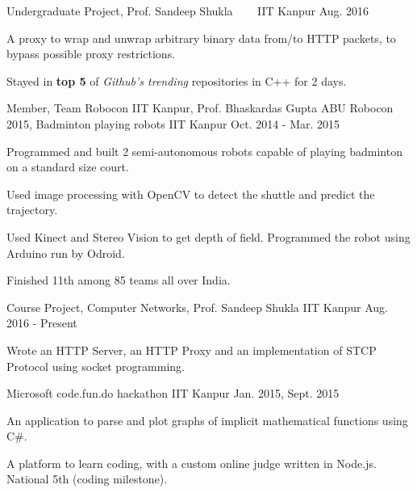\begin{cventries}
  \cventry
  {Undergraduate Project, Prof. Sandeep Shukla}
  {\href{https://github.com/sakshamsharma/HTTP-Over-Protocol}{}
    \ \ \ }
  {IIT Kanpur}
  {Aug. 2016}
  {
    \begin{cvitems}
    \item A proxy to wrap and unwrap arbitrary binary data from/to
      HTTP packets, to bypass possible proxy restrictions.
    \item Stayed in \textbf{top 5} of \textit{Github's trending}
      repositories in C++ for 2 days.
    \end{cvitems}
  }

  \cventry
  {Member, Team Robocon IIT Kanpur, Prof. Bhaskardas Gupta}
  {ABU Robocon 2015, Badminton playing robots}
  {IIT Kanpur}
  {Oct. 2014 - Mar. 2015}
  {
    \begin{cvitems}
    \item Programmed and built 2 semi-autonomous robots
      capable of playing badminton on a standard size court.
    \item Used image processing with OpenCV to detect the shuttle
      and predict the trajectory.
    \item Used Kinect and Stereo Vision to get depth of
      field. Programmed the robot using Arduino run by Odroid.
    \item Finished 11th among 85 teams all over India.
    \end{cvitems}
  }

  \cventry
  {Course Project, Computer Networks, Prof. Sandeep Shukla}
  {\href{https://github.com/sakshamsharma/Network-Implementation}{
      }}
  {IIT Kanpur}
  {Aug. 2016 - Present}
  {
    \begin{cvitems}
    \item Wrote an HTTP Server, an HTTP Proxy and an implementation of
      STCP Protocol using socket programming.
    \end{cvitems}
  }


  {Microsoft code.fun.do hackathon}
  {IIT Kanpur}
  {Jan. 2015, Sept. 2015}
  {
    \begin{cvitems}
    \item An application to parse and plot graphs of implicit
      mathematical functions using C\#.
    \item A platform to learn coding, with a
      custom online judge written in Node.js. National 5th (coding milestone).
    \end{cvitems}
  }

\end{cventries}

